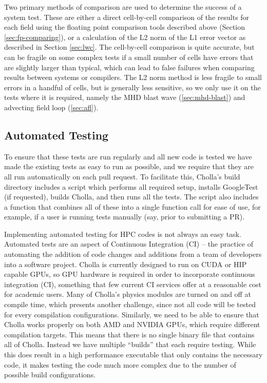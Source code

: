 \documentclass[modern, linenumbers]{aastex631}
\begin{document}
Two primary methods of comparison are used to determine the success of a system test. These are either a direct cell-by-cell comparison of the results for each field using the floating point comparison tools described above (Section \ref{sec:fp-comparing}), or a calculation of the L2 norm of the L1 error vector as described in Section \ref{sec:lwc}. The cell-by-cell comparison is quite accurate, but can be fragile on some complex tests if a small number of cells have errors that are slightly larger than typical, which can lead to false failures when comparing results between systems or compilers. The L2 norm method is less fragile to small errors in a handful of cells, but is generally less sensitive, so we only use it on the tests where it is required, namely the MHD blast wave (\autoref{sec:mhd-blast}) and advecting field loop (\autoref{sec:afl}).

\subsection{Automated Testing}

To ensure that these tests are run regularly and all new code is tested we have made the existing tests as easy to run as possible, and we require that they are all run automatically on each pull request. To facilitate this, Cholla's build directory includes a script which performs all required setup, installs GoogleTest (if requested), builds Cholla, and then runs all the tests. The script also includes a function that combines all of these into a single function call for ease of use, for example, if a user is running tests manually (say, prior to submitting a PR).

Implementing automated testing for HPC codes is not always an easy task. Automated tests are an aspect of Continuous Integration (CI) -- the practice of automating the addition of code changes and additions from a team of developers into a software project. Cholla is currently designed to run on CUDA or HIP capable GPUs, so GPU hardware is required in order to incorporate continuous integration (CI), something that few current CI services offer at a reasonable cost for academic users. Many of Cholla's physics modules are turned on and off at compile time, which presents another challenge, since not all code will be tested for every compilation configurations. Similarly, we need to be able to ensure that Cholla works properly on both AMD and NVIDIA GPUs, which require different compilation targets. This means that there is no single binary file that contains all of Cholla. Instead we have multiple ``builds'' that each require testing. While this does result in a high performance executable that only contains the necessary code, it makes testing the code much more complex due to the number of possible build configurations.
\end{document}
